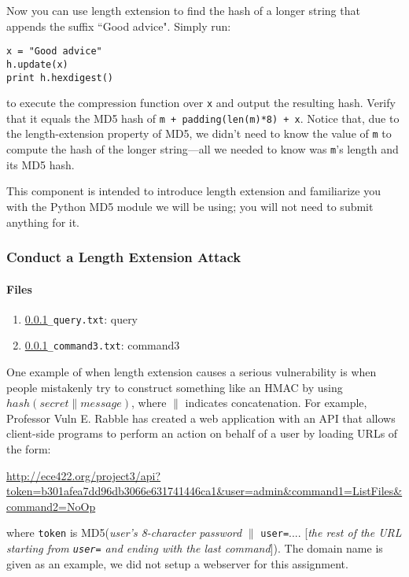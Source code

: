 \documentclass[letterpaper,12pt]{report}
\begin{document}
Now you can use length extension to find the hash of a longer string that appends the suffix ``Good advice".  Simply run:
\begin{mdframed}
\begin{verbatim}
x = "Good advice"
h.update(x)
print h.hexdigest()
\end{verbatim}
\end{mdframed}

to execute the compression function over \texttt{x} and output the resulting hash.  Verify that it equals the MD5 hash of \texttt{m + padding(len(m)*8) + x}.  Notice that, due to the length-extension property of MD5, we didn't need to know the value of \texttt{m} to compute the hash of the longer string---all we needed to know was \texttt{m}'s length and its MD5 hash.

\medskip

This component is intended to introduce length extension and familiarize you with the Python MD5 module we will be using; you will not need to submit anything for it.

\subsubsection{Conduct a Length Extension Attack}
 \label{sec:length_extension}
\paragraph{Files}

\begin{enumerate}
\item {\tt \ref{sec:length_extension}\_query.txt}: query
\item {\tt \ref{sec:length_extension}\_command3.txt}: command3
\end{enumerate}

One example of when length extension causes a serious vulnerability is when people mistakenly try to construct something like an HMAC by using $hash(secret \parallel message)$, where $\parallel$ indicates concatenation.  For example, Professor Vuln E. Rabble has created a web application with an API that allows client-side programs to perform an action on behalf of a user by loading URLs of the form:
 \medskip
 
{\url{http://ece422.org/project3/api?token=b301afea7dd96db3066e631741446ca1\&user=admin\&command1=ListFiles\&command2=NoOp}}

\medskip
 
where \texttt{token} is MD5(\emph{user's 8-character password} $\parallel$ \texttt{user=}.... [\emph{the rest of the URL starting from \texttt{user=} and ending with the last command}]).  The domain name is given as an example, we did not setup a webserver for this assignment.
 
\end{document}
